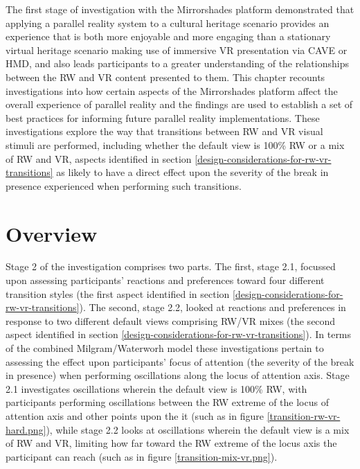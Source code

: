 
\label{chapter-eval-2}

The first stage of investigation with the Mirrorshades platform demonstrated that applying a parallel reality system to a cultural heritage scenario provides an experience that is both more enjoyable and more engaging than a stationary virtual heritage scenario making use of immersive VR presentation via CAVE or HMD, and also leads participants to a greater understanding of the relationships between the RW and VR content presented to them. This chapter recounts investigations into how certain aspects of the Mirrorshades platform affect the overall experience of parallel reality and the findings are used to establish a set of best practices for informing future parallel reality implementations. These investigations explore the way that transitions between RW and VR visual stimuli are performed, including whether the default view is 100\% RW or a mix of RW and VR, aspects identified in section \ref{design-considerations-for-rw-vr-transitions} as likely to have a direct effect upon the severity of the break in presence experienced when performing such transitions.


\section{Overview}

Stage 2 of the investigation comprises two parts. The first, stage 2.1, focussed upon assessing participants' reactions and preferences toward four different transition styles (the first aspect identified in section \ref{design-considerations-for-rw-vr-transitions}). The second, stage 2.2, looked at reactions and preferences in response to two different default views comprising RW/VR mixes (the second aspect identified in section \ref{design-considerations-for-rw-vr-transitions}). In terms of the combined Milgram/Waterworh model these investigations pertain to assessing the effect upon participants' focus of attention (the severity of the break in presence) when performing oscillations along the locus of attention axis. Stage 2.1 investigates oscillations wherein the default view is 100\% RW, with participants performing oscillations between the RW extreme of the locus of attention axis and other points upon the it (such as in figure \ref{transition-rw-vr-hard.png}), while stage 2.2 looks at oscillations wherein the default view is a mix of RW and VR, limiting how far toward the RW extreme of the locus axis the participant can reach (such as in figure \ref{transition-mix-vr.png}).

